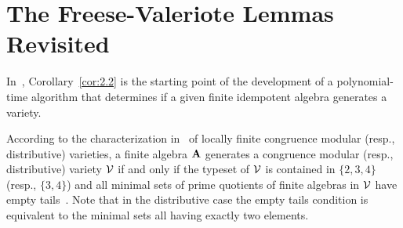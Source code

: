 \draftbreak

\section{The Freese-Valeriote Lemmas Revisited}
\label{sec:freese-valer-lemm}
In~\cite{Freese:2009}, Corollary~\ref{cor:2.2} is the starting point of the
development of a polynomial-time algorithm that determines if a given finite
idempotent algebra generates a \cm variety. 


According to the characterization
in~\cite[Ch.~8]{HM:1988} of locally finite congruence modular (resp.,
distributive) varieties, a finite algebra $\mathbf{A}$ generates a congruence modular
(resp., distributive) variety $\mathcal{V}$ if and only if the typeset of $\mathcal{V}$ is
contained in $\{2, 3, 4\}$ (resp., $\{3, 4\}$) and all minimal sets of prime
quotients of finite algebras in $\mathcal{V}$ have empty
tails~\cite[Def.~2.15]{HM:1988}. Note that in the distributive 
case the empty tails condition is equivalent to the minimal sets all having exactly
two elements.

